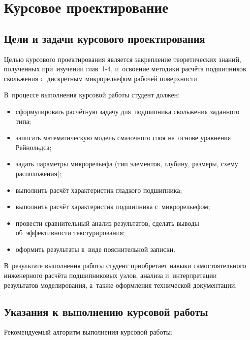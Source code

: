 \chapter{Курсовое проектирование}

\section{Цели и задачи курсового проектирования}

Целью курсового проектирования является закрепление теоретических знаний, полученных при~изучении глав~1-4, и~освоение методики расчёта подшипников скольжения с~дискретным микрорельефом рабочей поверхности.

В~процессе выполнения курсовой работы студент должен:
\begin{itemize}
\item сформулировать расчётную задачу для~подшипника скольжения заданного типа;
\item записать математическую модель смазочного слоя на~основе уравнения Рейнольдса;
\item задать параметры микрорельефа (тип элементов, глубину, размеры, схему расположения);
\item выполнить расчёт характеристик гладкого подшипника;
\item выполнить расчёт характеристик подшипника с~микрорельефом;
\item провести сравнительный анализ результатов, сделать выводы об~эффективности текстурирования;
\item оформить результаты в~виде пояснительной записки.
\end{itemize}

В~результате выполнения работы студент приобретает навыки самостоятельного инженерного расчёта подшипниковых узлов, анализа и~интерпретации результатов моделирования, а~также оформления технической документации.


\section{Указания к выполнению курсовой работы}

Рекомендуемый алгоритм выполнения курсовой работы:

